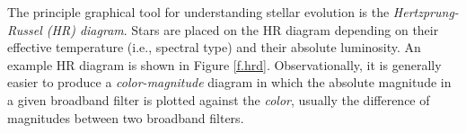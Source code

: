 The principle graphical tool for understanding stellar evolution is the {\it Hertzprung-Russel (HR) diagram}.
Stars are placed on the HR diagram depending on their effective temperature (i.e., spectral type) and their absolute luminosity.
An example HR diagram is shown in Figure \ref{f.hrd}.
Observationally, it is generally easier to produce a {\it color-magnitude} diagram in which the absolute magnitude in a given broadband filter is plotted against the {\it color}, usually the difference of magnitudes between two broadband filters.
